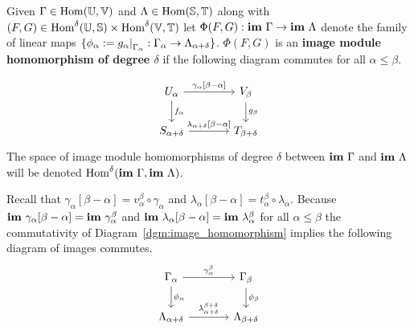 \begin{definition}
  Given $\Gamma\in\mathrm{Hom}(\mathbb{U},\mathbb{V})$ and $\Lambda\in\mathrm{Hom}(\mathbb{S},\mathbb{T})$ along with $(F,G)\in\mathrm{Hom}^\delta(\mathbb{U},\mathbb{S})\times\mathrm{Hom}^\delta(\mathbb{V},\mathbb{T})$ let $\Phi(F, G) : \mathbf{im}~\Gamma\to\mathbf{im}~\Lambda$ denote the family of linear maps $\{\phi_\alpha := g_\alpha\mathord{\mid}_{\Gamma_\alpha} : \Gamma_\alpha\to\Lambda_{\alpha+\delta}\}$.
  $\Phi(F, G)$ is an \textbf{image module homomorphism of degree $\delta$} if the following diagram commutes for all $\alpha\leq\beta$.

  \begin{equation}\label{dgm:image_homomorphism}
    \begin{tikzcd}[column sep=large]
        U_\alpha\arrow{r}{\gamma_\alpha[\beta-\alpha]}\arrow{d}{f_\alpha} &
      V_\beta\arrow{d}{g_\beta}\\
      S_{\alpha+\delta}\arrow{r}{\lambda_{\alpha+\delta}[\beta-\alpha]} &
      T_{\beta +\delta}
  \end{tikzcd}\end{equation}
  The space of image module homomorphisms of degree $\delta$ between $\mathbf{im}~\Gamma$ and $\mathbf{im}~\Lambda$ will be denoted $\mathrm{Hom}^\delta(\mathbf{im}~\Gamma,\mathbf{im}~\Lambda)$.
\end{definition}

Recall that $\gamma_\alpha[\beta-\alpha] = v_\alpha^\beta\circ\gamma_\alpha$ and $\lambda_\alpha[\beta-\alpha] = t_\alpha^\beta\circ\lambda_\alpha$.
Because $\mathbf{im}~\gamma_\alpha[\beta-\alpha] = \mathbf{im}~\gamma_\alpha^\beta$ and $\mathbf{im}~\lambda_{\alpha}[\beta-\alpha] = \mathbf{im}~\lambda_\alpha^\beta$ for all $\alpha\leq\beta$ the commutativity of Diagram~\ref{dgm:image_homomorphism} implies the following diagram of images commutes.
\begin{equation}\label{dgm:shifted_homomorphism}
  \begin{tikzcd}[column sep=large]
    \Gamma_\alpha\arrow{r}{\gamma_\alpha^\beta}\arrow{d}{\phi_\alpha} &
    \Gamma_\beta\arrow{d}{\phi_\beta}\\
    \Lambda_{\alpha+\delta}\arrow{r}{\lambda_{\alpha+\delta}^{\beta+\delta}} &
    \Lambda_{\beta +\delta}
\end{tikzcd}\end{equation}

